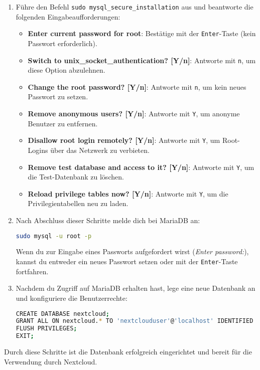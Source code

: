 \documentclass[a4paper,12pt]{article}
\begin{document}
\begin{enumerate}
    \item Führe den Befehl \texttt{sudo mysql\_secure\_installation} aus und beantworte die folgenden Eingabeaufforderungen:
    \begin{itemize}
        \item \textbf{Enter current password for root}: Bestätige mit der \texttt{Enter}-Taste (kein Passwort erforderlich).
        \item \textbf{Switch to unix\_socket\_authentication? [Y/n]}: Antworte mit \texttt{n}, um diese Option abzulehnen.
        \item \textbf{Change the root password? [Y/n]}: Antworte mit \texttt{n}, um kein neues Passwort zu setzen.
        \item \textbf{Remove anonymous users? [Y/n]}: Antworte mit \texttt{Y}, um anonyme Benutzer zu entfernen.
        \item \textbf{Disallow root login remotely? [Y/n]}: Antworte mit \texttt{Y}, um Root-Logins über das Netzwerk zu verbieten.
        \item \textbf{Remove test database and access to it? [Y/n]}: Antworte mit \texttt{Y}, um die Test-Datenbank zu löschen.
        \item \textbf{Reload privilege tables now? [Y/n]}: Antworte mit \texttt{Y}, um die Privilegientabellen neu zu laden.
    \end{itemize}
    
    \item Nach Abschluss dieser Schritte melde dich bei MariaDB an:
\begin{lstlisting}[language=bash]
sudo mysql -u root -p
\end{lstlisting}
    Wenn du zur Eingabe eines Passworts aufgefordert wirst (\textit{Enter password:}), kannst du entweder ein neues Passwort setzen oder mit der \texttt{Enter}-Taste fortfahren.
    
    \item Nachdem du Zugriff auf MariaDB erhalten hast, lege eine neue Datenbank an und konfiguriere die Benutzerrechte:
\begin{lstlisting}[language=bash]
CREATE DATABASE nextcloud;
GRANT ALL ON nextcloud.* TO 'nextclouduser'@'localhost' IDENTIFIED BY 'deinPasswort';
FLUSH PRIVILEGES;
EXIT;
\end{lstlisting}
\end{enumerate}

\noindent
Durch diese Schritte ist die Datenbank erfolgreich eingerichtet und bereit für die Verwendung durch Nextcloud.
\end{document}
